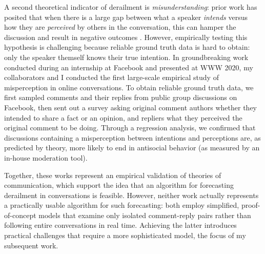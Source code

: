\documentclass[11pt,letterpaper]{article}
\begin{document}
A second theoretical indicator of derailment is \emph{misunderstanding}: prior work has posited that when there is a large gap between what a speaker \emph{intends} versus how they are \emph{perceived} by others in the conversation, this can hamper the discussion and result in negative outcomes \cite{tannen_indirectness_2000}.
However, empirically testing this hypothesis is challenging because reliable ground truth data is hard to obtain: only the speaker themself knows their true intention.
In groundbreaking work conducted during an internship at Facebook and presented at WWW 2020, my collaborators and I conducted the first large-scale empirical study of misperception in online conversations.
To obtain reliable ground truth data, we first sampled comments and their replies from public group discussions on Facebook, then sent out a survey asking original comment authors whether they intended to share a fact or an opinion, and repliers what they perceived the original comment to be doing.
Through a regression analysis, we confirmed that discussions containing a misperception between intentions and perceptions are, as predicted by theory, more likely to end in antisocial behavior (as measured by an in-house moderation tool).

Together, these works represent an empirical validation of theories of communication, which support the idea that an algorithm for forecasting derailment in conversations is feasible.
However, neither work actually represents a practically usable algorithm for such forecasting: both employ simplified, proof-of-concept models that examine only isolated comment-reply pairs rather than following entire conversations in real time.
Achieving the latter introduces practical challenges that require a more sophisticated model, the focus of my subsequent work.

\vspace{\baselineskip}


\end{document}
